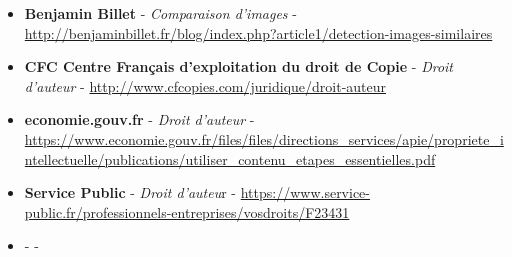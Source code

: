 \documentclass[a4paper,12pt]{article}
\begin{document}
\begin{itemize}
    \item \textbf{Benjamin Billet} - \textit{Comparaison d'images} - \url{http://benjaminbillet.fr/blog/index.php?article1/detection-images-similaires }
    \item \textbf{CFC Centre Français d'exploitation du droit de Copie} - \textit{Droit d'auteur} - \url{http://www.cfcopies.com/juridique/droit-auteur }
    \item \textbf{economie.gouv.fr} - \textit{Droit d'auteur} - \url{https://www.economie.gouv.fr/files/files/directions_services/apie/propriete_intellectuelle/publications/utiliser_contenu_etapes_essentielles.pdf }
    \item \textbf{Service Public} - \textit{Droit d'auteu}r - \url{https://www.service-public.fr/professionnels-entreprises/vosdroits/F23431 }
    
    
    
    \item \textbf{ } - \textit{ } - \url{ }
    
    
\end{itemize}






	


\end{document}
